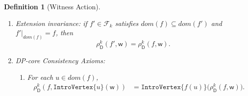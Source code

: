 \documentclass[10pt,a4paper]{amsart}
\newtheorem{definition}{Definition}
\newcommand{\action}{\rho}
\newcommand{\awitness}{\mathsf{w}}
\newcommand{\domain}{dom}
\newcommand{\dpcore}{\mathsf{D}}
\newcommand{\introvertextype}[1]{\mathtt{IntroVertex}\{#1\}}
\newcommand{\relabelclass}{\mathcal{F}}
\newcommand{\relabelingfunction}{f}
\newcommand{\treewidthvalue}{k}
\newcommand{\vertexone}{u}
\begin{document}
\begin{definition}[Witness Action]
\begin{enumerate}
\[	    \action_{\dpcore}^{\treewidthvalue}(\relabelingfunction,\action_{\dpcore}^{\treewidthvalue}(\relabelingfunction',\awitness)).\]
	    \item \label{condition:relabeldpcore-condition-extension-invariance}
	    Extension invariance:
	    if $\relabelingfunction'\in \relabelclass_{\treewidthvalue}$ satisfies $\domain(\relabelingfunction)\subseteq \domain(\relabelingfunction')$ and $\relabelingfunction'|_{\domain(\relabelingfunction)}=\relabelingfunction$, then
		    \[
		    \action_{\dpcore}^{\treewidthvalue}(\relabelingfunction',\awitness)=\action_{\dpcore}^{\treewidthvalue}(\relabelingfunction,\awitness).
		    \]

			    \item DP-core Consistency Axioms:
				    \begin{enumerate}
				    \item \label{condition:relabeldpcore-condition-four}
				    For each $\vertexone\in \domain(\relabelingfunction)$,
				    \[
				    \begin{aligned}
				    \action_{\dpcore}^{\treewidthvalue}(\relabelingfunction,\introvertextype{\vertexone}(\awitness))
				    &=
				    \introvertextype{\relabelingfunction(\vertexone)}\bigl(\action_{\dpcore}^{\treewidthvalue}(\relabelingfunction,\awitness)\bigr).
				    \end{aligned}
				    \]


\end{enumerate}
\end{enumerate}
\end{definition}
\end{document}
